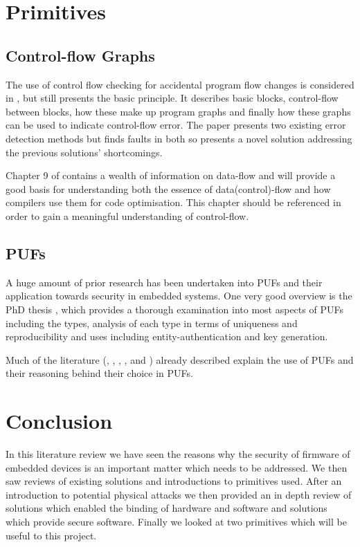 \section{Primitives}

\subsection{Control-flow Graphs}

The use of control flow checking for accidental program flow changes is considered in \cite{Goloubeva2003}, but still presents the basic principle. It describes basic blocks, control-flow between blocks, how these make up program graphs and finally how these graphs can be used to indicate control-flow error. The paper presents two existing error detection methods but finds faults in both so presents a novel solution addressing the previous solutions' shortcomings.

Chapter 9 of \cite{AhoAlfredV.2014C:pt} contains a wealth of information on data-flow and will provide a good basis for understanding both the essence of data(control)-flow and how compilers use them for code optimisation. This chapter should be referenced in order to gain a meaningful understanding of control-flow.


\subsection{PUFs}

A huge amount of prior research has been undertaken into PUFs and their application towards security in embedded systems. One very good overview is the PhD thesis \cite{Maes2012}, which provides a thorough examination into most aspects of PUFs including the types, analysis of each type in terms of uniqueness and reproducibility and uses including entity-authentication and key generation.

Much of the literature (\cite{Lee2016}, \cite{Schaller2014}, \cite{Kleber2015}, \cite{Kohnhauser2015}, \cite{Gora2010} and \cite{Simpson2006}) already described explain the use of PUFs and their reasoning behind their choice in PUFs.

\section{Conclusion}

In this literature review we have seen the reasons why the security of firmware of embedded devices is an important matter which needs to be addressed. We then saw reviews of existing solutions and introductions to primitives used. After an introduction to potential physical attacks we then provided an in depth review of solutions which enabled the binding of hardware and software and solutions which provide secure software. Finally we looked at two primitives which will be useful to this project.

